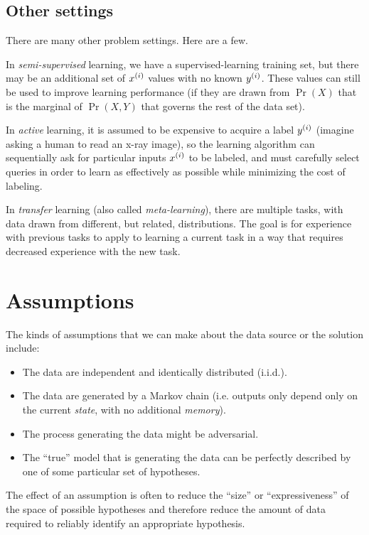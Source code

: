 \subsection{Other settings}
There are many other problem settings.  Here are a few.

In {\em semi-supervised} learning, we have a supervised-learning training set, but there may be an additional set of
$x^{(i)}$ values with no known $y^{(i)}$.  These values can still
be used to improve learning performance (if they are drawn from
$\Pr(X)$ that is the marginal of $\Pr(X, Y)$ that governs the rest of
the data set).

In {\em active} learning, it is assumed to be expensive to acquire a
label $y^{(i)}$ (imagine asking a human to read an x-ray image), so
the learning algorithm can sequentially ask for particular inputs
$x^{(i)}$ to be labeled, and must carefully select queries in order
to learn as effectively as possible while minimizing the cost of
labeling.

In {\em transfer} learning (also called {\em meta-learning}), there
are multiple tasks, with data drawn
from different, but related, distributions.  The goal is for
experience with previous tasks to apply to learning a current task in
a way that requires decreased experience with the new task.

\section{Assumptions}

The kinds of assumptions that we can make about the data source or the solution include:
\begin{itemize}
  \item The data are independent and identically distributed (i.i.d.).
  \item The data are generated by a Markov chain (i.e. outputs only depend only on the current {\em state}, with no additional {\em memory}).
  \item The process generating the data might be adversarial.
  \item The ``true'' model that is generating the data can be perfectly described by one of some particular set of hypotheses.
\end{itemize}
The effect of an assumption is often to reduce the ``size'' or
``expressiveness''  of the space
of possible hypotheses and therefore reduce the amount of data
required to reliably identify an appropriate hypothesis.

